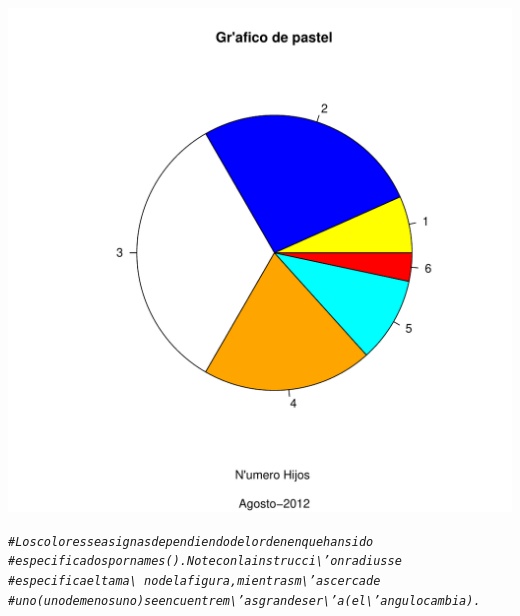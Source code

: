 \documentclass[12pt,letterpaper]{article}\usepackage[]{graphicx}\usepackage[]{color}
\makeatletter
\def\maxwidth{ %
  \ifdim\Gin@nat@width>\linewidth
    \linewidth
  \else
    \Gin@nat@width
  \fi
}
\newcommand{\hlcom}[1]{\textcolor[rgb]{0.678,0.584,0.686}{\textit{#1}}}%
\newenvironment{kframe}{%
 \def\at@end@of@kframe{}%
 \ifinner\ifhmode%
  \def\at@end@of@kframe{\end{minipage}}%
  \begin{minipage}{\columnwidth}%
 \fi\fi%
 \def\FrameCommand##1{\hskip\@totalleftmargin \hskip-\fboxsep
 \colorbox{shadecolor}{##1}\hskip-\fboxsep
     \hskip-\linewidth \hskip-\@totalleftmargin \hskip\columnwidth}%
 \MakeFramed {\advance\hsize-\width
   \@totalleftmargin\z@ \linewidth\hsize
   \@setminipage}}%
 {\par\unskip\endMakeFramed%
 \at@end@of@kframe}
\newenvironment{knitrout}{}{} %
\makeatother
\begin{document}
\begin{knitrout}
\begin{kframe}
\begin{alltt}
\end{alltt}
\end{kframe}
\includegraphics[width=\maxwidth]{figure/unnamed-chunk-9-2} 
\begin{kframe}\begin{alltt}
\hlcom{# Los colores se asignas dependiendo del orden en que han sido }
\hlcom{# especificados por names().Note con la instrucci\textbackslash{}'on radius se }
\hlcom{# especifica el tama\textbackslash{}~no de la figura, mientras m\textbackslash{}'as cerca de}
\hlcom{# uno (uno de menos uno) se encuentre m\textbackslash{}'as grande ser\textbackslash{}'a (el \textbackslash{}'angulo cambia).}
\end{alltt}
\end{kframe}
\end{knitrout}
\end{document}
